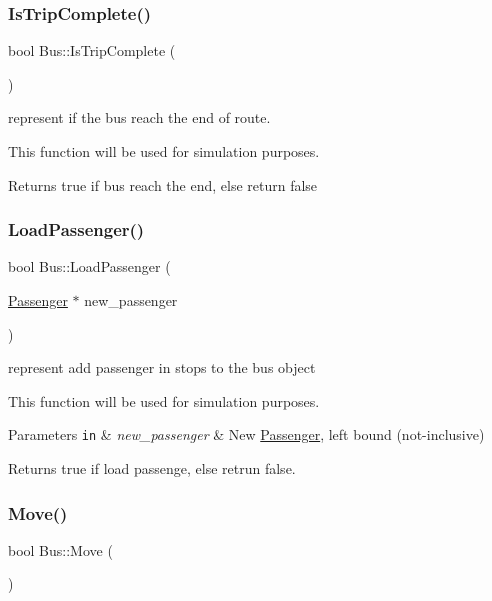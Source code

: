 \subsubsection{\texorpdfstring{Is\+Trip\+Complete()}{IsTripComplete()}}
{\footnotesize\ttfamily bool Bus\+::\+Is\+Trip\+Complete (\begin{DoxyParamCaption}{ }\end{DoxyParamCaption})}



represent if the bus reach the end of route. 

This function will be used for simulation purposes.

\begin{DoxyReturn}{Returns}
true if bus reach the end, else return false 
\end{DoxyReturn}
\mbox{\label{classBus_ac3f1c523bc4f97bc8ada8dc488ab3484}} 
\subsubsection{\texorpdfstring{Load\+Passenger()}{LoadPassenger()}}
{\footnotesize\ttfamily bool Bus\+::\+Load\+Passenger (\begin{DoxyParamCaption}\item[{\hyperlink{classPassenger}{Passenger} $\ast$}]{new\+\_\+passenger }\end{DoxyParamCaption})}



represent add passenger in stops to the bus object 

This function will be used for simulation purposes.


\begin{DoxyParams}[1]{Parameters}
\mbox{\tt in}  & {\em new\+\_\+passenger} & New \hyperlink{classPassenger}{Passenger}, left bound (not-\/inclusive)\\
\hline
\end{DoxyParams}
\begin{DoxyReturn}{Returns}
true if load passenge, else retrun false. 
\end{DoxyReturn}
\mbox{\label{classBus_a5e667186d6db0916ebab0e4eff3312c8}} 
\subsubsection{\texorpdfstring{Move()}{Move()}}
{\footnotesize\ttfamily bool Bus\+::\+Move (\begin{DoxyParamCaption}{ }\end{DoxyParamCaption})}



